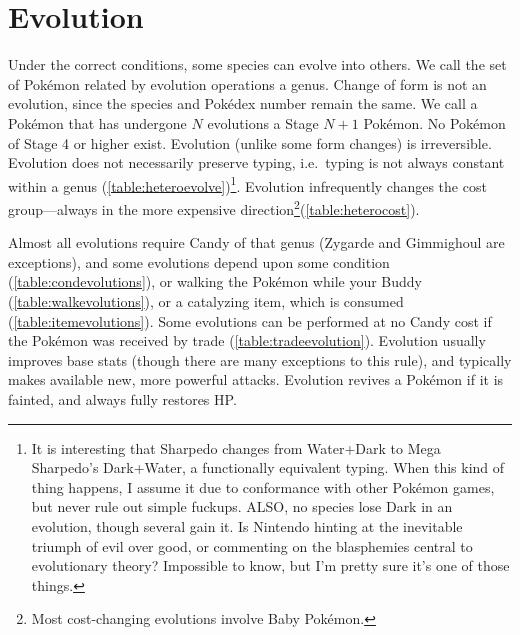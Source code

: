 \section{Evolution\label{sec:evolution}}
Under the correct conditions, some species can evolve into others.
We call the set of Pokémon related by evolution operations a genus.
Change of form is not an evolution, since the species and Pokédex number remain the same.
We call a Pokémon that has undergone $N$ evolutions a Stage $N+1$ Pokémon.
No Pokémon of Stage 4 or higher exist.
Evolution (unlike some form changes) is irreversible.
Evolution does not necessarily preserve typing, i.e.\ typing is not always constant within a genus (\autoref{table:heteroevolve})\footnote{It is interesting
  that Sharpedo changes from Water+Dark to Mega Sharpedo's Dark+Water,
  a functionally equivalent typing. When this kind of thing happens,
  I assume it due to conformance with other Pokémon games, but never
  rule out simple fuckups. ALSO, no species lose Dark in an evolution,
  though several gain it. Is Nintendo hinting at the inevitable triumph of
  evil over good, or commenting on the blasphemies central to evolutionary theory?
  Impossible to know, but I'm pretty sure it's one of those things.}.
Evolution infrequently changes the cost group---always in the more expensive direction\footnote{Most
  cost-changing evolutions involve Baby Pokémon.}(\autoref{table:heterocost}).

Almost all evolutions require Candy of that genus (Zygarde and Gimmighoul are exceptions),
  and some evolutions depend upon some condition (\autoref{table:condevolutions}),
  or walking the Pokémon while your Buddy (\autoref{table:walkevolutions}),
  or a catalyzing item, which is consumed (\autoref{table:itemevolutions}).
Some evolutions can be performed at no Candy cost if the Pokémon was received by trade
 (\autoref{table:tradeevolution}).
Evolution usually improves base stats (though there are many exceptions to this rule),
  and typically makes available new, more powerful attacks.
Evolution revives a Pokémon if it is fainted, and always fully restores HP\@.
